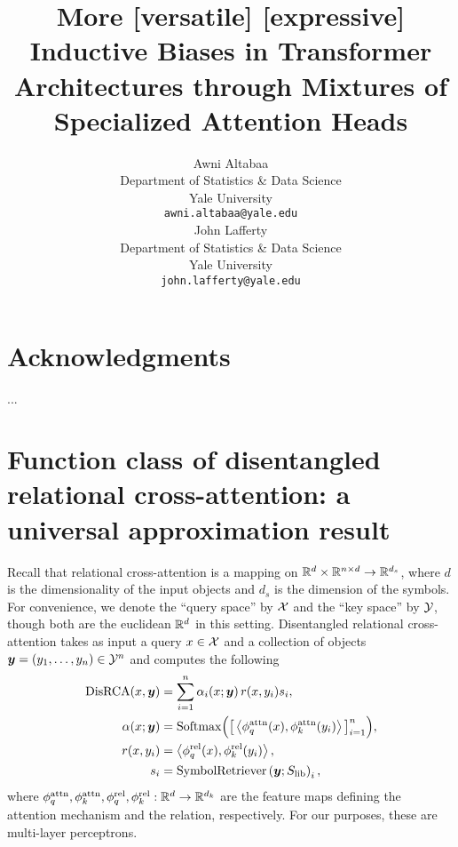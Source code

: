\documentclass{article}
\title{More [versatile] [expressive] Inductive Biases in Transformer Architectures through Mixtures of Specialized Attention Heads}
\author{%
  Awni Altabaa\\ %
  Department of Statistics \& Data Science\\
  Yale University\\
  \texttt{awni.altabaa@yale.edu} \\
  \And
  John Lafferty \\
  Department of Statistics \& Data Science \\
  Yale University \\
  \texttt{john.lafferty@yale.edu}
}
\begin{document}
\maketitle




\tableofcontents

\newpage















\section*{Acknowledgments}
...

\printbibliography


\listoffixmes

\clearpage
\newpage


\appendix

\section{Function class of disentangled relational cross-attention: a universal approximation result}

Recall that relational cross-attention is a mapping on $\mathbb{R}^d \times \mathbb{R}^{n \times d} \to \mathbb{R}^{d_s}$, where $d$ is the dimensionality of the input objects and $d_s$ is the dimension of the symbols. For convenience, we denote the ``query space'' by ${\mathcal{X}}$ and the ``key space'' by ${\mathcal{Y}}$, though both are the euclidean $\mathbb{R}^d$ in this setting. Disentangled relational cross-attention takes as input a query $x \in {\mathcal{X}}$ and a collection of objects $\bm{y} = (y_1, \ldots, y_n) \in {\mathcal{Y}}^n$ and computes the following
\begin{align}
  \mathrm{DisRCA}(x, \bm{y}) &= \sum_{i=1}^{n} \alpha_i(x; \bm{y}) \, r(x, y_i) s_i, \\
  \alpha(x; \bm{y}) &= \mathrm{Softmax}\Big(\big[\left \langle \phi_q^{\mathrm{attn}}(x), \phi_k^{\mathrm{attn}}(y_i) \right\rangle\big]_{i=1}^{n}\Big), \\
  r(x, y_i) &= \left \langle \phi_q^{\mathrm{rel}}(x), \phi_k^{\mathrm{rel}}(y_i) \right\rangle, \\
  s_i &= \mathrm{SymbolRetriever}\left(\bm{y}; S_\mathrm{lib}\right)_i,
\end{align}
where $\phi_q^{\mathrm{attn}}, \phi_k^{\mathrm{attn}}, \phi_q^{\mathrm{rel}}, \phi_k^{\mathrm{rel}}: \mathbb{R}^{d} \to \mathbb{R}^{d_k}$ are the feature maps defining the attention mechanism and the relation, respectively. For our purposes, these are multi-layer perceptrons.
\end{document}
